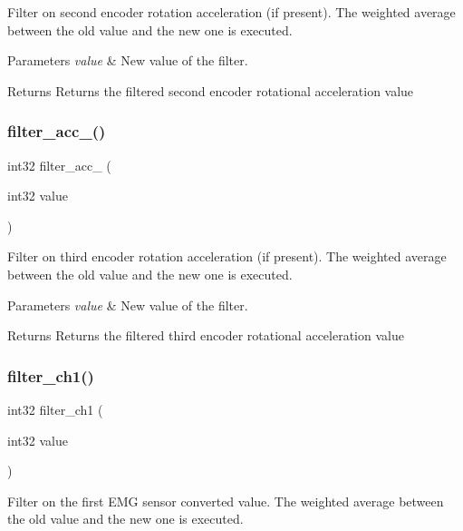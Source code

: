 Filter on second encoder rotation acceleration (if present). The weighted average between the old value and the new one is executed.


\begin{DoxyParams}{Parameters}
{\em value} & New value of the filter.\\
\hline
\end{DoxyParams}
\begin{DoxyReturn}{Returns}
Returns the filtered second encoder rotational acceleration value 
\end{DoxyReturn}
\mbox{\label{utils_8c_afbd3d0d191893b101de61bea2b04d7f2}} 
\subsubsection{filter\+\_\+acc\+\_()}
{\footnotesize\ttfamily int32 filter\+\_\+acc\+\_ (\begin{DoxyParamCaption}\item[{int32}]{value }\end{DoxyParamCaption})}

Filter on third encoder rotation acceleration (if present). The weighted average between the old value and the new one is executed.


\begin{DoxyParams}{Parameters}
{\em value} & New value of the filter.\\
\hline
\end{DoxyParams}
\begin{DoxyReturn}{Returns}
Returns the filtered third encoder rotational acceleration value 
\end{DoxyReturn}
\mbox{\label{utils_8c_a9bed4948a884d80dc0d3511648e8eef3}} 
\subsubsection{filter\+\_\+ch1()}
{\footnotesize\ttfamily int32 filter\+\_\+ch1 (\begin{DoxyParamCaption}\item[{int32}]{value }\end{DoxyParamCaption})}

Filter on the first E\+MG sensor converted value. The weighted average between the old value and the new one is executed.


